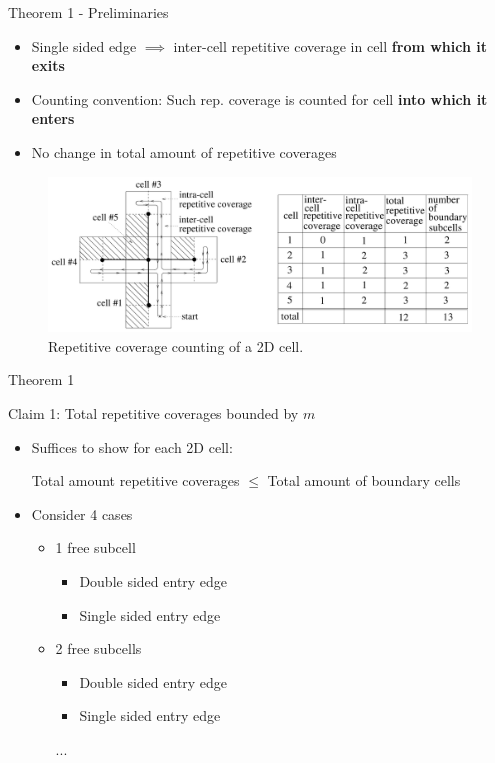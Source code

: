 \documentclass{beamer}
\begin{document}
\begin{frame}{Theorem 1 - Preliminaries}
    \begin{itemize}
        \item Single sided edge $\implies$ inter-cell repetitive coverage in cell \textbf{from which it exits}
        \item Counting convention: Such rep. coverage is counted for cell \textbf{into which it enters}
        \item No change in total amount of repetitive coverages
    \end{itemize}
    \begin{figure}
        \includegraphics[width=\linewidth]{Images/inv_fig9.png}
        \caption{Repetitive coverage counting of a 2D cell.}
    \end{figure}
\end{frame}


\begin{frame}{Theorem 1}
    \begin{block}{Claim 1: Total repetitive coverages bounded by $m$}
        \begin{itemize}
            \item Suffices to show for each 2D cell:

                  Total amount repetitive coverages $\leq$ Total amount of boundary cells
            \item Consider 4 cases
                  \begin{itemize}
                      \item 1 free subcell
                            \begin{itemize}
                                \item Double sided entry edge
                                \item Single sided entry edge
                            \end{itemize}
                      \item 2 free subcells
                            \begin{itemize}
                                \item Double sided entry edge
                                \item Single sided entry edge
                            \end{itemize}
                            ...
                  \end{itemize}
        \end{itemize}
    \end{block}
\end{frame}
\end{document}
